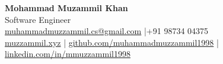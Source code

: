 \documentclass[a4paper,10pt]{article}
\begin{document}

\begin{center}
  {\LARGE\bfseries Mohammad Muzammil Khan}\\[2pt]
  {\normalsize Software Engineer}\\[4pt]
  \href{mailto:muhammadmuzzammil.cs@gmail.com}{muhammadmuzzammil.cs@gmail.com}
  \quad|\quad +91 98734 04375\\
  \href{https://muzzammil.xyz}{muzzammil.xyz}
  \quad|\quad
  \href{https://github.com/muhammadmuzzammil1998}{github.com/muhammadmuzzammil1998}
  \quad|\quad
  \href{https://linkedin.com/in/mmuzzammil1998}{linkedin.com/in/mmuzzammil1998}
\end{center}
\vspace{-4pt}








\end{document}
